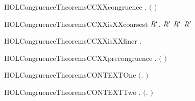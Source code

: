 \begin{SaveVerbatim}{HOLCongruenceTheoremsCCXXcongruence}
\HOLTokenTurnstile{} \HOLSymConst{\HOLTokenForall{}}.   \HOLSymConst{\HOLTokenImp{}}  \ensuremath{(} \ensuremath{)}
\end{SaveVerbatim}
\newcommand{\HOLCongruenceTheoremsCCXXcongruence}{\UseVerbatim{HOLCongruenceTheoremsCCXXcongruence}}
\begin{SaveVerbatim}{HOLCongruenceTheoremsCCXXisXXcoarsest}
\HOLTokenTurnstile{} \HOLSymConst{\HOLTokenForall{}} \ensuremath{\HOLBoundVar{R}\sp{\prime}}.  \ensuremath{\HOLBoundVar{R}\sp{\prime}} \HOLSymConst{\HOLTokenConj{}} \ensuremath{\HOLBoundVar{R}\sp{\prime}}   \HOLSymConst{\HOLTokenImp{}} \ensuremath{\HOLBoundVar{R}\sp{\prime}}   
\end{SaveVerbatim}
\newcommand{\HOLCongruenceTheoremsCCXXisXXcoarsest}{\UseVerbatim{HOLCongruenceTheoremsCCXXisXXcoarsest}}
\begin{SaveVerbatim}{HOLCongruenceTheoremsCCXXisXXfiner}
\HOLTokenTurnstile{} \HOLSymConst{\HOLTokenForall{}}.    
\end{SaveVerbatim}
\newcommand{\HOLCongruenceTheoremsCCXXisXXfiner}{\UseVerbatim{HOLCongruenceTheoremsCCXXisXXfiner}}
\begin{SaveVerbatim}{HOLCongruenceTheoremsCCXXprecongruence}
\HOLTokenTurnstile{} \HOLSymConst{\HOLTokenForall{}}.   \HOLSymConst{\HOLTokenImp{}}  \ensuremath{(} \ensuremath{)}
\end{SaveVerbatim}
\newcommand{\HOLCongruenceTheoremsCCXXprecongruence}{\UseVerbatim{HOLCongruenceTheoremsCCXXprecongruence}}
\begin{SaveVerbatim}{HOLCongruenceTheoremsCONTEXTOne}
\HOLTokenTurnstile{}  \ensuremath{(}\HOLTokenLambda{}. \ensuremath{)}
\end{SaveVerbatim}
\newcommand{\HOLCongruenceTheoremsCONTEXTOne}{\UseVerbatim{HOLCongruenceTheoremsCONTEXTOne}}
\begin{SaveVerbatim}{HOLCongruenceTheoremsCONTEXTTwo}
\HOLTokenTurnstile{} \HOLSymConst{\HOLTokenForall{}}.  \ensuremath{(}\HOLTokenLambda{}. \ensuremath{)}
\end{SaveVerbatim}
